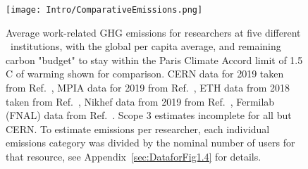 \documentclass[../SustainableHEP.tex]{subfiles}
\begin{document}
\begin{figure}
    \centering
    \texttt{[image: Intro/ComparativeEmissions.png]}
    \caption[Work-related GHG emissions for researchers across \ACR\ institutions]{Average work-related GHG emissions for researchers at five different \ACR\ institutions, with the global per capita average, and remaining carbon "budget" to stay within the Paris Climate Accord limit of 1.5 \degree C of warming shown for comparison.
    CERN data for 2019 taken from Ref.~\cite{Environment:2737239,CERN-HR-STAFF-STAT-2019,CERN:2723123}, MPIA data for 2019 from Ref.~\cite{Jahnke2020}, ETH data from 2018 taken from Ref.~\cite{Beisert2020}, Nikhef data from 2019 from Ref.~\cite{Nikhef}, Fermilab (FNAL) data from Ref.~\cite{FermilabEnvReport2019}. Scope 3 estimates incomplete for all but CERN.  To estimate emissions per researcher, each individual emissions category was divided by the nominal number of users for that resource, see Appendix~\ref{sec:DataforFig1.4} for details.
    \label{fig:Intro-ComparativeEmissions}}
\end{figure}

\pagebreak
\end{document}
